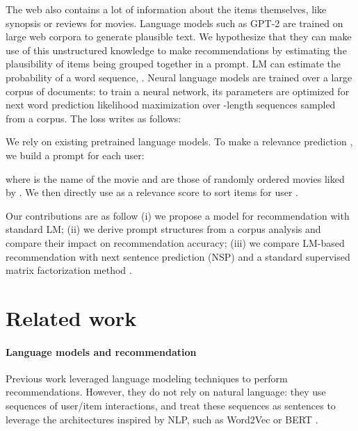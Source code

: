 \documentclass[runningheads]{llncs}
\begin{document}
\vspace{-0.5cm}
The web also contains a lot of information about the items themselves, like synopsis or reviews for movies. Language models such as GPT-2 \cite{radford2019language} are trained on large web corpora to generate plausible text. We hypothesize that they can make use of this unstructured knowledge to make recommendations by estimating the plausibility of items being grouped together in a prompt. LM can estimate the probability of a word sequence, .  Neural language models are trained over a large corpus of documents: to train a neural network, its parameters  are optimized for next word prediction likelihood maximization over -length sequences sampled from a corpus. The loss writes as follows:


We rely on existing pretrained language models. To make a relevance prediction , we build a prompt for each user:
\vspace{-0.2cm}

where  is the name of the movie  and  are those of randomly ordered movies liked by . We then directly use  as a relevance score to sort items for user .

Our contributions are as follow (i) we propose a model for recommendation with standard LM; (ii) we derive prompt structures from a corpus analysis and compare their impact on recommendation accuracy; (iii) we compare LM-based recommendation with next sentence prediction (NSP) \cite{Penha20} and a standard supervised matrix factorization method \cite{koren2009matrix,rendle2012bpr}.

\section{Related work}

\paragraph{\textbf{Language models and recommendation}}  
Previous work leveraged language modeling techniques to perform recommendations. However, they do not rely on natural language: they use sequences of user/item interactions, and treat these sequences as sentences to leverage the architectures inspired by NLP, such as Word2Vec \cite{guardia2015latent,barkan2017item2vec,devooght2017long,li2018learning} or BERT \cite{BERT4Recs}. \vspace{-0.15cm}
\end{document}
